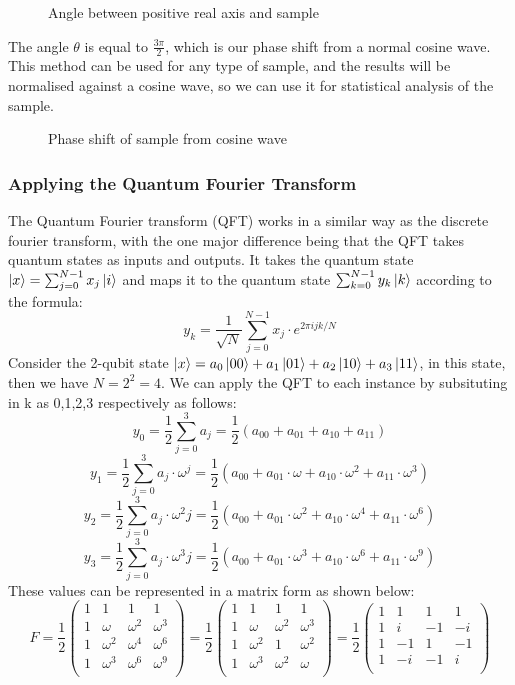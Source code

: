 \begin{figure}[!htb]
\centering
\resizebox{6cm}{!}{}
\caption{Angle between positive real axis and sample}
\label{fig:complex}
\end{figure}
The angle $\theta$ is equal to $\frac{3\pi}{2}$, which is our phase shift from a normal cosine wave. This method can be used for any type of sample, and the results will be normalised against a cosine wave, so we can use it for statistical analysis of the sample.
\begin{figure}[!htb]
\centering
\resizebox{8cm}{!}{}
\caption{Phase shift of sample from cosine wave}
\label{fig:phase}
\end{figure}
\subsubsection{Applying the Quantum Fourier Transform}
The Quantum Fourier transform (QFT) works in a similar way as the discrete fourier transform, with the one major difference being that the QFT takes quantum states as inputs and outputs. It takes the quantum state $\ket{x} = \sum_{j=0}^{N-1}x_j\ket{i}$ and maps it to the quantum state  $\sum_{k=0}^{N-1}y_k\ket{k}$ according to the formula:
$$y_k = \frac{1}{\sqrt{N}}\sum_{j=0}^{N-1}x_j\cdot{e^{2\pi ijk/N}}$$
Consider the 2-qubit state $\ket{x} = a_0\ket{00} + a_1\ket{01} + a_2\ket{10} + a_3\ket{11}$, in this state, then we have $N = 2^2 = 4$. We can apply the QFT to each instance by subsituting in k as 0,1,2,3 respectively as follows:
$$y_0 = \frac{1}{2}\sum_{j=0}^{3}a_j=\frac{1}{2}(a_{00}+a_{01}+a_{10}+a_{11})$$
$$y_1 = \frac{1}{2}\sum_{j=0}^{3}a_j\cdot{\omega^j}=\frac{1}{2}(a_{00}+a_{01}\cdot{\omega}+a_{10}\cdot{\omega^2}+a_{11}\cdot{\omega^3})$$
$$y_2 = \frac{1}{2}\sum_{j=0}^{3}a_j\cdot{\omega^2j}=\frac{1}{2}(a_{00}+a_{01}\cdot{\omega^2}+a_{10}\cdot{\omega^4}+a_{11}\cdot{\omega^6})$$
$$y_3 = \frac{1}{2}\sum_{j=0}^{3}a_j\cdot{\omega^3j}=\frac{1}{2}(a_{00}+a_{01}\cdot{\omega^3}+a_{10}\cdot{\omega^6}+a_{11}\cdot{\omega^9})$$
These values can be represented in a matrix form as shown below:
$$F = \frac{1}{2}
\begin{pmatrix} 
1 & 1 & 1 & 1 \\
1 & \omega & \omega^2 & \omega^3 \\
1 & \omega^2 & \omega^4 & \omega^6 \\
1 & \omega^3 & \omega^6 & \omega^9 \\
\end{pmatrix} = \frac{1}{2} 
\begin{pmatrix}
1 & 1 & 1 & 1 \\
1 & \omega & \omega^2 & \omega^3 \\
1 & \omega^2 & 1 & \omega^2 \\
1 & \omega^3 & \omega^2 & \omega \\
\end{pmatrix} = \frac{1}{2} 
\begin{pmatrix}
1 & 1 & 1 & 1 \\
1 & i & -1 & -i \\
1 & -1 & 1 & -1 \\
1 & -i & -1 & i \\
\end{pmatrix}
$$
